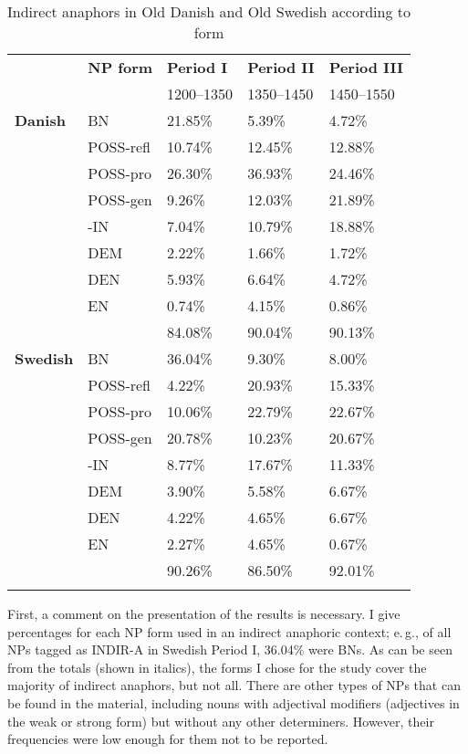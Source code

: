 \documentclass[output=paper]{langsci/langscibook}
\begin{document}
\begin{table}
\centering
\begin{tabular}{m{55pt}m{55pt}m{55pt}m{55pt}m{55pt}}
\lsptoprule
  & {\textbf{NP form}} & {\textbf{Period I}} & {\textbf{Period II}} & {\textbf{Period III}} \\
  &   & 1200--1350 & 1350--1450 & 1450--1550 \\
\midrule
{\textbf{Danish}} & BN		& 21.85\%		& 5.39\%		& 4.72\%	\\ 
 & POSS-refl	& 10.74\%		& 12.45\%		& 12.88\% \\ 
 & POSS-pro	& 26.30\%		& 36.93\%		& 24.46\% \\ 
 & POSS-gen	& 9.26\%		& 12.03\%		& 21.89\% \\ 
 & -IN		& 7.04\%		& 10.79\%		& 18.88\% \\ 
 & DEM		& 2.22\%		& 1.66\%		& 1.72\% \\ 
 & DEN		& 5.93\%		& 6.64\%		& 4.72\% \\ 
 & EN		& 0.74\%		& 4.15\%		& 0.86\% \\ 
 \cmidrule{3-5}
 & 			& 84.08\% 	& 90.04\%		& 90.13\% \\ 
\midrule
{\textbf{Swedish}} & BN & 36.04\%	& 9.30\%	& 8.00\% \\ 
 & POSS-refl	& 4.22\%		& 20.93\%		& 15.33\% \\ 
 & POSS-pro	& 10.06\%		& 22.79\%		& 22.67\% \\ 
 & POSS-gen	& 20.78\%		& 10.23\%		& 20.67\% \\ 
 & -IN		& 8.77\%		& 17.67\%		& 11.33\% \\ 
 & DEM		& 3.90\%		& 5.58\%		& 6.67\% \\ 
 & DEN		& 4.22\%		& 4.65\%		& 6.67\% \\ 
 & EN		& 2.27\%		& 4.65\%		& 0.67\% \\ 
  \cmidrule{3-5}
 & 			& 90.26\%	 	& 86.50\% 	& 92.01\% \\
\lspbottomrule
\end{tabular}
\caption{Indirect anaphors in Old Danish and Old Swedish according to form}\label{6table:3}
\end{table}

First, a comment on the presentation of the results is necessary. I give percentages for each NP form used in an indirect anaphoric context; e.\,g., of all NPs tagged as INDIR-A in Swedish Period I, 36.04\% were BNs. As can be seen from the totals (shown in italics), the forms I chose for the study cover the majority of indirect anaphors, but not all. There are other types of NPs that can be found in the material, including nouns with adjectival modifiers (adjectives in the weak or strong form) but without any other determiners. However, their frequencies were low enough for them not to be reported. 
\end{document}
